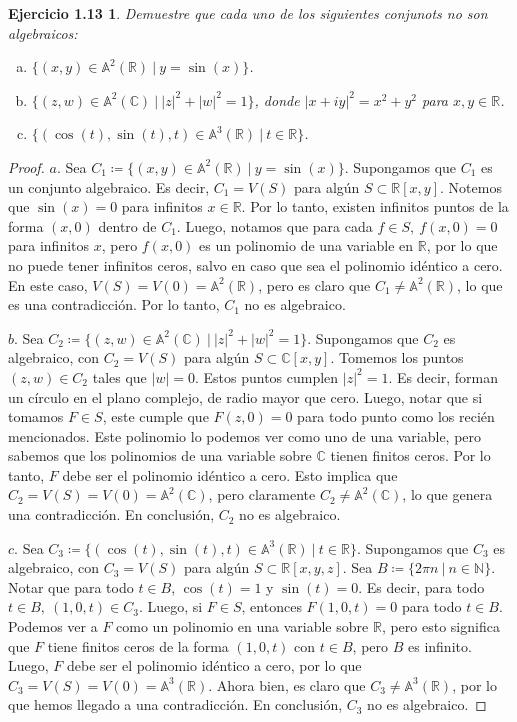 \documentclass{amsart}
\theoremstyle{plain}
\newtheorem*{ejercicio2}{Ejercicio 1.13}
\newcommand{\R}{\mathbb{R}}
\newcommand{\C}{\mathbb{C}}
\begin{document}
	\begin{ejercicio2}
		Demuestre que cada uno de los siguientes conjunots no son algebraicos:
		\begin{enumerate}[a)]
			\item $\{(x,y) \in \mathbb{A}^{2}(\R) \ | \ y = \sin(x)\}$. 

			\item $\{(z,w) \in \mathbb{A}^{2}(\C) \ \big| \ |z|^{2} + |w|^{2} = 1\}$, donde $|x + iy|^{2} = x^{2} + y^{2}$ para $x,y \in \R$.

			\item $\{(\cos(t), \sin(t), t) \in \mathbb{A}^{3}(\R) \ | \ t \in \R\}$. 
		\end{enumerate}
	\end{ejercicio2}
	\begin{proof}
		$\boxed{a.}$ Sea $C_{1} \coloneq \{(x,y) \in \mathbb{A}^{2}(\R) \ | \ y = \sin(x)\}$. Supongamos que $C_{1}$ es un conjunto algebraico. Es decir, $C_{1} = V(S)$ para algún $S \subset \R[x,y]$. Notemos que $\sin(x) = 0$ para infinitos $x \in \R$. Por lo tanto, existen infinitos puntos de la forma $(x, 0)$ dentro de $C_{1}$. Luego, notamos que para cada $f \in S,\ f(x,0) = 0$ para infinitos $x$, pero $f(x,0)$ es un polinomio de una variable en $\R$, por lo que no puede tener infinitos ceros, salvo en caso que sea el polinomio idéntico a cero. En este caso, $V(S) = V(0) = \mathbb{A}^{2}(\R)$, pero es claro que $C_{1} \neq \mathbb{A}^{2}(\R)$, lo que es una contradicción. Por lo tanto, $C_{1}$ no es algebraico. \par
		$\boxed{b.}$ Sea $C_{2} \coloneq \{(z,w) \in \mathbb{A}^{2}(\C) \ \big| \ |z|^{2} + |w|^{2} = 1\}$. Supongamos que $C_{2}$ es algebraico, con $C_{2} = V(S)$ para algún $S \subset \C[x,y]$. Tomemos los puntos $(z,w) \in C_{2}$ tales que $|w| = 0$. Estos puntos cumplen $|z|^{2} = 1$. Es decir, forman un círculo en el plano complejo, de radio mayor que cero. Luego, notar que si tomamos $F \in S$, este cumple que $F(z, 0) = 0$ para todo punto como los recién mencionados. Este polinomio lo podemos ver como uno de una variable, pero sabemos que los polinomios de una variable sobre $\C$ tienen finitos ceros. Por lo tanto, $F$ debe ser el polinomio idéntico a cero. Esto implica que $C_{2} = V(S) = V(0) = \mathbb{A}^{2}(\C)$, pero claramente $C_{2} \neq \mathbb{A}^{2}(\C)$, lo que genera una contradicción. En conclusión, $C_{2}$ no es algebraico. \par
		$\boxed{c.}$ Sea $C_{3} \coloneq \{(\cos(t), \sin(t), t) \in \mathbb{A}^{3}(\R) \ | \ t \in \R\}$. Supongamos que $C_{3}$ es algebraico, con $C_{3} = V(S)$ para algún $S \subset \R[x,y,z]$. Sea $B \coloneq \{2\pi n \ | \ n \in \mathbb{N}\}$. Notar que para todo $t \in B$, $\cos(t) = 1$ y $\sin(t) = 0$. Es decir, para todo $t \in B,\ (1,0,t) \in C_{3}$. Luego, si $F \in S$, entonces $F(1,0,t) = 0$ para todo $t \in B$. Podemos ver a $F$ como un polinomio en una variable sobre $\R$, pero esto significa que $F$ tiene finitos ceros de la forma $(1, 0, t)$ con $t \in B$, pero $B$ es infinito. Luego, $F$ debe ser el polinomio idéntico a cero, por lo que $C_{3} = V(S) = V(0) = \mathbb{A}^{3}(\R)$. Ahora bien, es claro que $C_{3} \neq \mathbb{A}^{3}(\R)$, por lo que hemos llegado a una contradicción. En conclusión, $C_{3}$ no es algebraico.

\end{proof}
\end{document}
